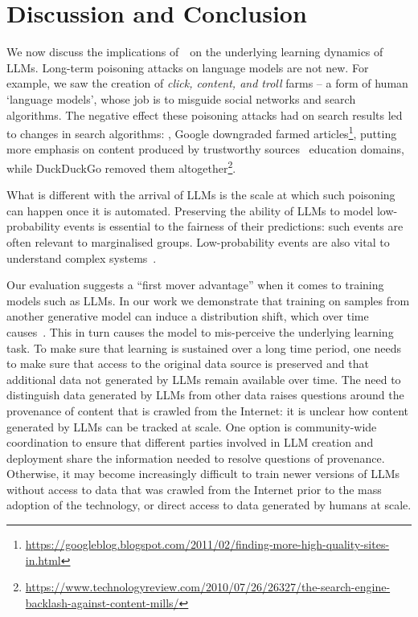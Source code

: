 \section{Discussion and Conclusion}

We now discuss the implications of~\Md~on the underlying learning dynamics of LLMs. Long-term poisoning attacks on language models are not new. For example, we saw the creation of \textit{click, content, and troll} farms -- a form of human `language models', whose job is to misguide social networks and  search algorithms. %
The negative effect  these poisoning attacks had on search results led to changes in search algorithms: \eg, Google downgraded farmed articles\footnote{\url{https://googleblog.blogspot.com/2011/02/finding-more-high-quality-sites-in.html}}, putting more emphasis on content produced by trustworthy sources \eg~education domains, while DuckDuckGo removed them altogether\footnote{\url{https://www.technologyreview.com/2010/07/26/26327/the-search-engine-backlash-against-content-mills/}}.  

What is different with the arrival of LLMs is the scale at which such poisoning can happen once it is automated. Preserving the ability of LLMs to model low-probability events is essential to the fairness of their predictions: such events are often relevant to marginalised groups. %
Low-probability events are also vital to understand complex systems~\citep{taleb2007black}. %

Our evaluation suggests a ``first mover advantage'' when it comes to training models such as LLMs. In our work we demonstrate that training on samples from another generative model can induce a distribution shift, which over time causes~\Md. This in turn causes the model to mis-perceive the underlying learning task. To make sure that learning is sustained over a long time period, one needs to make sure that access to the original data source is preserved and that additional data not generated by LLMs remain available over time. %
The need to distinguish data generated by LLMs from other data raises questions around the provenance of content that is crawled from the Internet: it is unclear how content  generated by LLMs can be tracked at scale. 
One option is community-wide coordination to ensure that different parties involved in LLM creation and deployment share the information needed to resolve questions of provenance. 
Otherwise, it may become increasingly difficult to train newer versions of LLMs without access to data that was crawled from the Internet prior to the mass adoption of the technology, or direct access to data generated by humans at scale.








